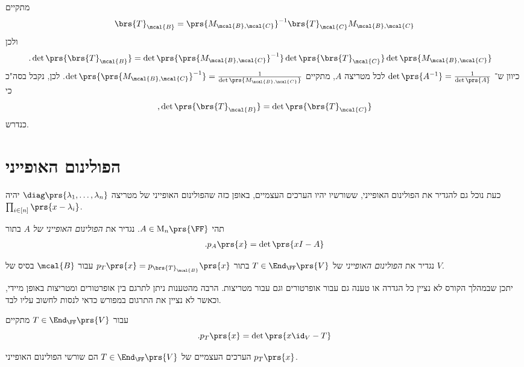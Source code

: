 \documentclass[a4paper,10pt,twoside,openany]{book}
\renewcommand{\Mat}{\mathrm{M}}
\begin{document}
\begin{solution}
מתקיים
\begin{align*}
\brs{T}_\mcal{B} = \prs{M_{\mcal{B},\mcal{C}}}^{-1} \brs{T}_\mcal{C} M_{\mcal{B},\mcal{C}}
\end{align*}
ולכן
\begin{align*}
\text{.} \det\prs{\brs{T}_\mcal{B}} &= \det\prs{\prs{M_{\mcal{B},\mcal{C}}}^{-1}} \det\prs{\brs{T}_\mcal{C}} \det\prs{M_{\mcal{B},\mcal{C}}}
\end{align*}
כיוון ש־%
$\det\prs{A^{-1}} = \frac{1}{\det\prs{A}}$
 לכל מטריצה
 $A$,
 מתקיים
 $\det\prs{\prs{M_{\mcal{B},\mcal{C}}}^{-1}} = \frac{1}{\det\prs{M_{\mcal{B},\mcal{C}}}}$.
 לכן, נקבל בסה"כ כי
 \[\text{,} \det\prs{\brs{T}_\mcal{B}} = \det\prs{\brs{T}_\mcal{C}}\]
 כנדרש.
\end{solution}

\section{הפולינום האופייני}

כעת נוכל גם להגדיר את הפולינום האופייני, ששורשיו יהיו הערכים העצמיים, באופן כזה שהפולינום האופייני של מטריצה
$\diag\prs{\lambda_1, \ldots, \lambda_n}$
יהיה
$\prod_{i \in [n]} \prs{x - \lambda_i}$.

\begin{definition}
תהי
$A \in \Mat_n\prs{\FF}$.
נגדיר את
\emph{הפולינום האופייני של
$A$}
בתור
\begin{align*}
\text{.} p_A\prs{x} = \det\prs{x I - A}
\end{align*}

נגדיר את
\emph{הפולינום האופייני}
של
$T \in \End_\FF\prs{V}$
בתור
$p_T\prs{x} = p_{\brs{T}_{\mcal{B}}}\prs{x}$
עבור
$\mcal{B}$
בסיס של
$V$.
\end{definition}

\begin{remark}
יתכן שבמהלך הקורס לא נציין כל הגדרה או טענה גם עבור אופרטורים וגם עבור מטריצות. הרבה מהטענות ניתן לתרגם בין אופרטורים ומטריצות באופן מיידי, וכאשר לא נציין את התרגום במפורש כדאי לנסות לחשוב עליו לבד.
\end{remark}

\begin{remark}
עבור
$T \in \End_\FF\prs{V}$
מתקיים
\[\text{.} p_T\prs{x} = \det\prs{x \id_V - T}\]
\end{remark}

\begin{proposition}
הערכים העצמיים של
$T \in \End_\FF\prs{V}$
הם שורשי הפולינום האופייני
$p_T\prs{x}$.
\end{proposition}
\end{document}
